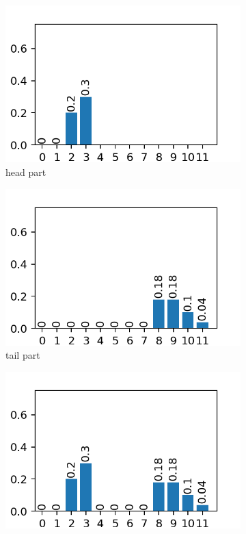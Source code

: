 \documentclass[a4paper,oneside]{csthesis}
\begin{document}
\begin{enumerate}
\begin{figure}[h]
\begin{subfigure}[c]{0.3\textwidth}
            \includegraphics[width=\textwidth]{figures/ex_split_3a.png}
            \caption{head part}
        \end{subfigure}
        \begin{subfigure}[c]{0.3\textwidth}
            \includegraphics[width=\textwidth]{figures/ex_split_3b.png}
            \caption{tail part}
        \end{subfigure}
        \begin{subfigure}[c]{0.3\textwidth}
            \includegraphics[width=\textwidth]{figures/ex_split_3c.png}

\end{subfigure}
\end{figure}
\end{enumerate}
\end{document}

